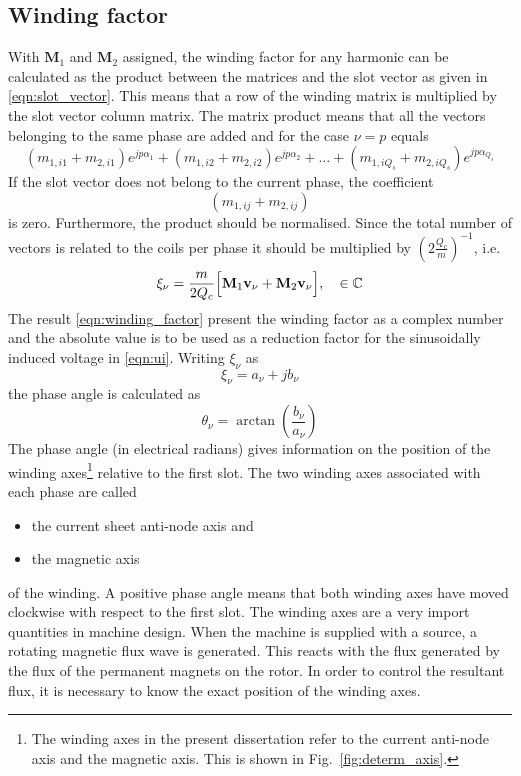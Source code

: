 \subsection{Winding factor}
With $\mathbf{M}_1$ and $\mathbf{M}_2$ assigned, the winding factor for any harmonic can be calculated as the product between the matrices and the slot vector as given in \eqref{eqn:slot_vector}. This means that a row of the winding matrix is multiplied by the slot vector column matrix. The matrix product means that all the vectors belonging to the same phase are added and for the case $\nu=p$ equals
\begin{equation}
  \label{eqn:m1_m2_exp}
  (m_{1,i1}+m_{2,i1})e^{jp\alpha_1}+(m_{1,i2}+m_{2,i2})e^{jp\alpha_2}+\ldots+
  (m_{1,iQ_s}+m_{2,iQ_s})e^{jp \alpha_{Q_s}}
\end{equation}
If the slot vector does not belong to the current phase, the coefficient
\begin{equation} 
  \left(m_{1,ij}+m_{2,ij}\right)
\end{equation} 
is zero. Furthermore, the product should be normalised. Since the total number of vectors is related to the coils per phase it should be multiplied by $\left(2\frac{Q_c}{m}\right)^{-1}$, i.e.
\begin{equation}
  \label{eqn:winding_factor}
  \xi_{\nu} = \frac{m}{2Q_c}
  \Bigl[
    \mathbf{M}_1\mathbf{v_{\nu}}+\mathbf{M}_2\mathbf{v_{\nu}}
  \Bigr], 
  \quad \in \mathbb{C}
\end{equation}
The result \eqref{eqn:winding_factor} present the winding factor as a complex number and the absolute value is to be used as a reduction factor for the sinusoidally induced voltage in \eqref{eqn:ui}. Writing $\xi_{\nu}$ as
\begin{equation}
  \xi_{\nu} = a_{\nu}+jb_{\nu}
\end{equation}
the phase angle is calculated as 
\begin{equation}
  \theta_{\nu} = \arctan\left(\frac{b_{\nu}}{a_{\nu}}\right)
\end{equation}
The phase angle (in electrical radians) gives information on the position of the winding axes\footnote{The winding axes in the present dissertation refer to the current anti-node axis and the magnetic axis. This is shown in Fig.~\ref{fig:determ_axis}.} relative to the first slot. The two winding axes associated with each phase are called
\begin{itemize}
	\item the current sheet anti-node axis and
	\item the magnetic axis
\end{itemize}
of the winding. A positive phase angle means that both winding axes have moved clockwise with respect to the first slot. The winding axes are a very import quantities in machine design. When the machine is supplied with a source, a rotating magnetic flux wave is generated. This reacts with the flux generated by the flux of the permanent magnets on the rotor. In order to control the resultant flux, it is necessary to know the exact position of the winding axes.  

